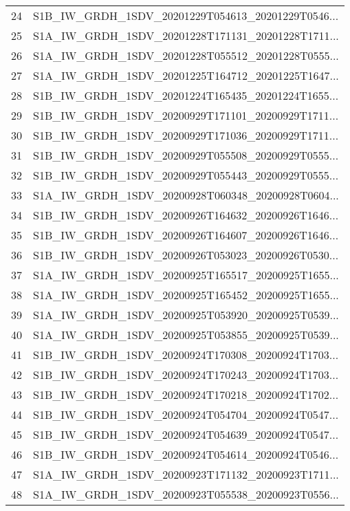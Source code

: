 \begin{tabular}{ll}
24  &  S1B\_IW\_GRDH\_1SDV\_20201229T054613\_20201229T0546... \\
25  &  S1A\_IW\_GRDH\_1SDV\_20201228T171131\_20201228T1711... \\
26  &  S1A\_IW\_GRDH\_1SDV\_20201228T055512\_20201228T0555... \\
27  &  S1A\_IW\_GRDH\_1SDV\_20201225T164712\_20201225T1647... \\
28  &  S1B\_IW\_GRDH\_1SDV\_20201224T165435\_20201224T1655... \\
29  &  S1B\_IW\_GRDH\_1SDV\_20200929T171101\_20200929T1711... \\
30  &  S1B\_IW\_GRDH\_1SDV\_20200929T171036\_20200929T1711... \\
31  &  S1B\_IW\_GRDH\_1SDV\_20200929T055508\_20200929T0555... \\
32  &  S1B\_IW\_GRDH\_1SDV\_20200929T055443\_20200929T0555... \\
33  &  S1A\_IW\_GRDH\_1SDV\_20200928T060348\_20200928T0604... \\
34  &  S1B\_IW\_GRDH\_1SDV\_20200926T164632\_20200926T1646... \\
35  &  S1B\_IW\_GRDH\_1SDV\_20200926T164607\_20200926T1646... \\
36  &  S1B\_IW\_GRDH\_1SDV\_20200926T053023\_20200926T0530... \\
37  &  S1A\_IW\_GRDH\_1SDV\_20200925T165517\_20200925T1655... \\
38  &  S1A\_IW\_GRDH\_1SDV\_20200925T165452\_20200925T1655... \\
39  &  S1A\_IW\_GRDH\_1SDV\_20200925T053920\_20200925T0539... \\
40  &  S1A\_IW\_GRDH\_1SDV\_20200925T053855\_20200925T0539... \\
41  &  S1B\_IW\_GRDH\_1SDV\_20200924T170308\_20200924T1703... \\
42  &  S1B\_IW\_GRDH\_1SDV\_20200924T170243\_20200924T1703... \\
43  &  S1B\_IW\_GRDH\_1SDV\_20200924T170218\_20200924T1702... \\
44  &  S1B\_IW\_GRDH\_1SDV\_20200924T054704\_20200924T0547... \\
45  &  S1B\_IW\_GRDH\_1SDV\_20200924T054639\_20200924T0547... \\
46  &  S1B\_IW\_GRDH\_1SDV\_20200924T054614\_20200924T0546... \\
47  &  S1A\_IW\_GRDH\_1SDV\_20200923T171132\_20200923T1711... \\
48  &  S1A\_IW\_GRDH\_1SDV\_20200923T055538\_20200923T0556... \\

\end{tabular}
